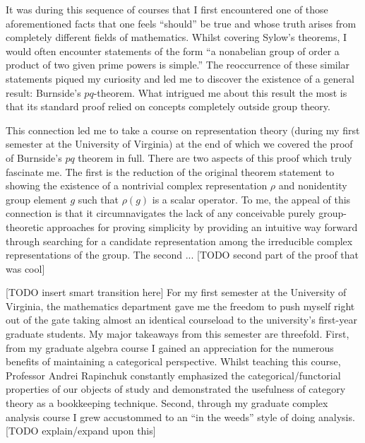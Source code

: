 \documentclass[12pt]{article}
\begin{document}
It was during this sequence of courses that I first encountered one of those aforementioned facts that one feels ``should'' be true and whose truth arises from completely different fields of mathematics. Whilst covering Sylow's theorems, I would often encounter statements of the form ``a nonabelian group of order a product of two given prime powers is simple.'' The reoccurrence of these similar statements piqued my curiosity and led me to discover the existence of a general result: Burnside's $pq$-theorem. What intrigued me about this result the most is that its standard proof relied on concepts completely outside group theory.

This connection led me to take a course on representation theory (during my first semester at the University of Virginia) at the end of which we covered the proof of Burnside's $pq$ theorem in full. There are two aspects of this proof which truly fascinate me. The first is the reduction of the original theorem statement to showing the existence of a nontrivial complex representation $\rho$ and nonidentity group element $g$ such that $\rho(g)$ is a scalar operator. To me, the appeal of this connection is that it circumnavigates the lack of any conceivable purely group-theoretic approaches for proving simplicity by providing an intuitive way forward through searching for a candidate representation among the irreducible complex representations of the group. The second ... [TODO second part of the proof that was cool]




[TODO insert smart transition here] For my first semester at the University of Virginia, the mathematics department gave me the freedom to push myself right out of the gate taking almost an identical courseload to the university's first-year graduate students. My major takeaways from this semester are threefold. First, from my graduate algebra course I gained an appreciation for the numerous benefits of maintaining a categorical perspective.
Whilst teaching this course, Professor Andrei Rapinchuk constantly emphasized the categorical/functorial properties of our objects of study and demonstrated the usefulness of category theory as a bookkeeping technique. Second, through my graduate complex analysis course I grew accustommed to an ``in the weeds'' style of doing analysis. [TODO explain/expand upon this]
\end{document}
